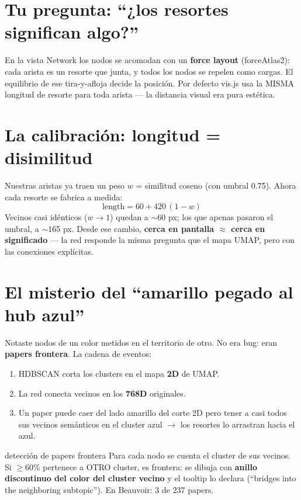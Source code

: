 \documentclass[11pt,a4paper]{article}
\begin{document}

\section{Tu pregunta: ``¿los resortes significan algo?''}

En la vista Network los nodos se acomodan con un \textbf{force layout} (forceAtlas2):
cada arista es un resorte que junta, y todos los nodos se repelen como cargas. El
equilibrio de ese tira-y-afloja decide la posición. Por defecto vis.js usa la MISMA
longitud de resorte para toda arista — la distancia visual era pura estética.

\section{La calibración: longitud = disimilitud}

Nuestras aristas ya traen un peso $w$ = similitud coseno (con umbral 0.75). Ahora cada
resorte se fabrica a medida:
\[
\mathrm{length} = 60 + 420\,(1 - w)
\]
Vecinos casi idénticos ($w \to 1$) quedan a $\sim$60 px; los que apenas pasaron el
umbral, a $\sim$165 px. Desde ese cambio, \textbf{cerca en pantalla $\approx$ cerca en
significado} — la red responde la misma pregunta que el mapa UMAP, pero con las
conexiones explícitas.

\section{El misterio del ``amarillo pegado al hub azul''}

Notaste nodos de un color metidos en el territorio de otro. No era bug: eran
\textbf{papers frontera}. La cadena de eventos:

\begin{enumerate}
  \item HDBSCAN corta los clusters en el mapa \textbf{2D} de UMAP.
  \item La red conecta vecinos en los \textbf{768D} originales.
  \item Un paper puede caer del lado amarillo del corte 2D pero tener a casi todos sus
        vecinos semánticos en el cluster azul $\rightarrow$ los resortes lo arrastran
        hacia el azul.
\end{enumerate}

\begin{concepto}{detección de papers frontera}
Para cada nodo se cuenta el cluster de sus vecinos. Si $\geq 60\%$ pertenece a OTRO
cluster, es frontera: se dibuja con \textbf{anillo discontinuo del color del cluster
vecino} y el tooltip lo declara (``bridges into the neighboring subtopic''). En
Beauvoir: 3 de 237 papers.
\end{concepto}
\end{document}
